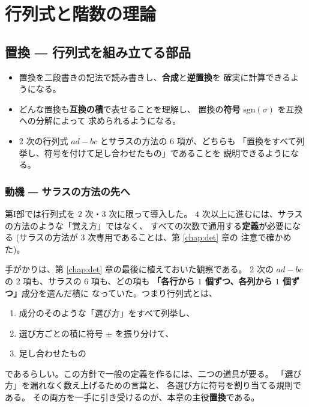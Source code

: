 \part{行列式と階数の理論}

\chapter{置換 ― 行列式を組み立てる部品}\label{chap:perm}

\begin{goal}
\begin{itemize}
\item 置換を二段書きの記法で読み書きし、\textbf{合成}と\textbf{逆置換}を
確実に計算できるようになる。
\item どんな置換も\textbf{互換の積}で表せることを理解し、
置換の\textbf{符号} $\mathrm{sgn}(\sigma)$ を互換への分解によって
求められるようになる。
\item $2$ 次の行列式 $ad - bc$ とサラスの方法の $6$ 項が、どちらも
「置換をすべて列挙し、符号を付けて足し合わせたもの」であることを
説明できるようになる。
\end{itemize}
\end{goal}

\section{動機 ― サラスの方法の先へ}

第I部では行列式を $2$ 次・$3$ 次に限って導入した。
$4$ 次以上に進むには、サラスの方法のような「覚え方」ではなく、
すべての次数で通用する\textbf{定義}が必要になる
(サラスの方法が $3$ 次専用であることは、第 \ref{chap:det} 章の
注意で確かめた)。

手がかりは、第 \ref{chap:det} 章の最後に植えておいた観察である。
$2$ 次の $ad - bc$ の $2$ 項も、サラスの $6$ 項も、どの項も
\textbf{「各行から $1$ 個ずつ、各列から $1$ 個ずつ」}成分を選んだ積に
なっていた。つまり行列式とは、
\begin{enumerate}
\item 成分のそのような「選び方」をすべて列挙し、
\item 選び方ごとの積に符号 $\pm$ を振り分けて、
\item 足し合わせたもの
\end{enumerate}
であるらしい。この方針で一般の定義を作るには、二つの道具が要る。
「選び方」を漏れなく数え上げるための言葉と、
各選び方に符号を割り当てる規則である。
その両方を一手に引き受けるのが、本章の主役\textbf{置換}である。

